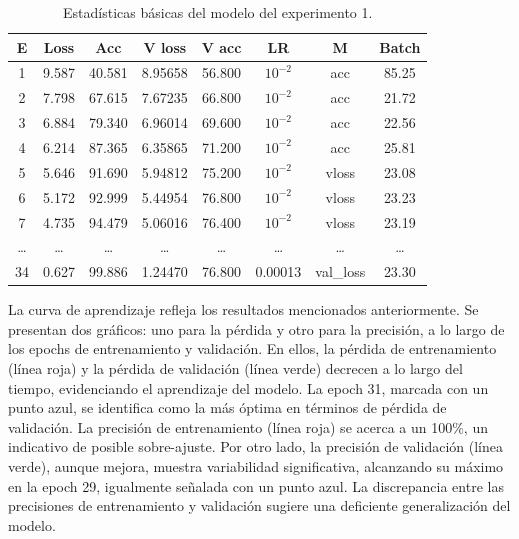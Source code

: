     \begin{table}[H]
      \small
      \begin{center}
          \begin{tabular}{|c|c|c|c|c|c|c|c|} \hline
          E & Loss & Acc & V loss & V acc & LR & M & Batch \\ \hline
          1 & 9.587 & 40.581 & 8.95658 & 56.800 & $10^{-2}$ & acc & 85.25 \\ \hline
          2 & 7.798 & 67.615 & 7.67235 & 66.800 & $10^{-2}$ & acc & 21.72 \\ \hline
          3 & 6.884 & 79.340 & 6.96014 & 69.600 & $10^{-2}$ & acc & 22.56 \\ \hline
          4 & 6.214 & 87.365 & 6.35865 & 71.200 & $10^{-2}$ & acc & 25.81 \\ \hline
          5 & 5.646 & 91.690 & 5.94812 & 75.200 & $10^{-2}$ & vloss & 23.08 \\ \hline
          6 & 5.172 & 92.999 & 5.44954 & 76.800 & $10^{-2}$ & vloss & 23.23 \\ \hline
          7 & 4.735 & 94.479 & 5.06016 & 76.400 & $10^{-2}$ & vloss & 23.19 \\ \hline
          \dots & \dots & \dots & \dots & \dots & \dots & \dots & \dots \\ \hline
          34 & 0.627 & 99.886 & 1.24470 & 76.800 & 0.00013 & val\_loss & 23.30 \\ \hline
          \end{tabular}
          \caption{Estadísticas básicas del modelo del experimento 1.}
      \end{center}\label{fig:estadisticas_p1}
  \end{table}

La curva de aprendizaje refleja los resultados mencionados anteriormente. Se presentan dos gráficos: uno para la pérdida y otro para la precisión, a lo largo de los epochs de entrenamiento y validación. En ellos, la pérdida de entrenamiento (línea roja) y la pérdida de validación (línea verde) decrecen a lo largo del tiempo, evidenciando el aprendizaje del modelo. La epoch 31, marcada con un punto azul, se identifica como la más óptima en términos de pérdida de validación. La precisión de entrenamiento (línea roja) se acerca a un 100\%, un indicativo de posible sobre-ajuste. Por otro lado, la precisión de validación (línea verde), aunque mejora, muestra variabilidad significativa, alcanzando su máximo en la epoch 29, igualmente señalada con un punto azul. La discrepancia entre las precisiones de entrenamiento y validación sugiere una deficiente generalización del modelo.

